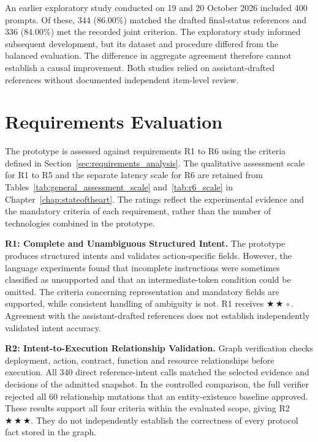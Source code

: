 An earlier exploratory study conducted on 19 and 20 October 2026
included 400 prompts. Of these, 344 (86.00\%) matched the drafted
final-status references and 336 (84.00\%) met the recorded joint
criterion. The exploratory study informed subsequent development,
but its dataset and procedure differed from the balanced evaluation.
The difference in aggregate agreement therefore cannot establish
a causal improvement. Both studies relied on assistant-drafted
references without documented independent item-level review.

\section{Requirements Evaluation}
\label{sec:requirements_evaluation}

The prototype is assessed against requirements R1 to R6 using the criteria defined
in Section~\ref{sec:requirements_analysis}. The qualitative assessment scale
for R1 to R5 and the separate latency scale for R6 are retained from
Tables~\ref{tab:general_assessment_scale} and~\ref{tab:r6_scale} in Chapter~\ref{chap:stateoftheart}. The ratings reflect the experimental evidence
and the mandatory criteria of each requirement, rather than the number of
technologies combined in the prototype.

\begingroup
\providecommand{\evThree}{\ensuremath{\bigstar\,\bigstar\,\bigstar}}
\providecommand{\evTwo}{\ensuremath{\bigstar\,\bigstar\,\circ}}
\providecommand{\evOne}{\ensuremath{\bigstar\,\circ\,\circ}}
\providecommand{\evZero}{\ensuremath{\circ\,\circ\,\circ}}

\noindent\textbf{R1: Complete and Unambiguous Structured Intent.}
The prototype produces structured intents and validates action-specific fields.
However, the language experiments found that incomplete instructions were
sometimes classified as unsupported and that an intermediate-token condition
could be omitted. The criteria concerning representation and mandatory fields
are supported, while consistent handling of ambiguity is not. R1 receives
\evTwo. Agreement with the assistant-drafted references does not establish
independently validated intent accuracy.

\medskip\noindent\textbf{R2: Intent-to-Execution Relationship Validation.}
Graph verification checks deployment, action, contract, function and resource
relationships before execution. All 340 direct reference-intent calls matched
the selected evidence and decisions of the admitted snapshot. In the controlled
comparison, the full verifier rejected all 60 relationship mutations that
an entity-existence baseline approved. These results support all four criteria
within the evaluated scope, giving R2 \evThree. They do not independently
establish the correctness of every protocol fact stored in the graph.

